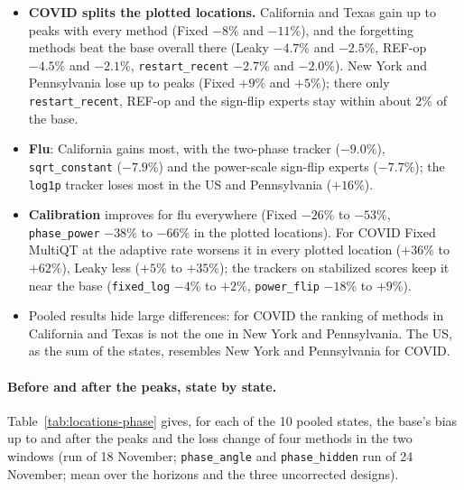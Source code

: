\documentclass[11pt,a4paper]{article}
\theoremstyle{definition}
\theoremstyle{remark}
\begin{document}
\begin{itemize}[leftmargin=*,itemsep=3pt]
\item \textbf{COVID splits the plotted locations.} California and Texas
gain up to peaks with every method (Fixed $-8\%$ and $-11\%$), and the
forgetting methods beat the base overall there (Leaky $-4.7\%$ and
$-2.5\%$, REF-op $-4.5\%$ and $-2.1\%$, \texttt{restart\_recent} $-2.7\%$
and $-2.0\%$). New York and Pennsylvania lose up to peaks (Fixed $+9\%$
and $+5\%$); there only \texttt{restart\_recent}, REF-op and the sign-flip
experts stay within about $2\%$ of the base.
\item \textbf{Flu}: California gains most, with the two-phase tracker
($-9.0\%$), \texttt{sqrt\_constant} ($-7.9\%$) and the power-scale
sign-flip experts ($-7.7\%$); the \texttt{log1p} tracker loses most in the
US and Pennsylvania ($+16\%$).
\item \textbf{Calibration} improves for flu everywhere (Fixed $-26\%$ to
$-53\%$, \texttt{phase\_power} $-38\%$ to $-66\%$ in the plotted
locations). For COVID Fixed MultiQT at the adaptive rate worsens it in
every plotted location ($+36\%$ to $+62\%$), Leaky less ($+5\%$ to
$+35\%$); the trackers on stabilized scores keep it near the base
(\texttt{fixed\_log} $-4\%$ to $+2\%$, \texttt{power\_flip} $-18\%$ to
$+9\%$).
\item Pooled results hide large differences: for COVID the ranking of
methods in California and Texas is not the one in New York and
Pennsylvania. The US, as the sum of the states, resembles New York and
Pennsylvania for COVID.
\end{itemize}
\paragraph{Before and after the peaks, state by state.}
Table~\ref{tab:locations-phase} gives, for each of the 10 pooled states, the
base's bias up to and after the peaks and the loss change of four methods in
the two windows (run of 18 November; \texttt{phase\_angle} and
\texttt{phase\_hidden} run of 24 November; mean over the horizons and the three
uncorrected designs).
\end{document}
